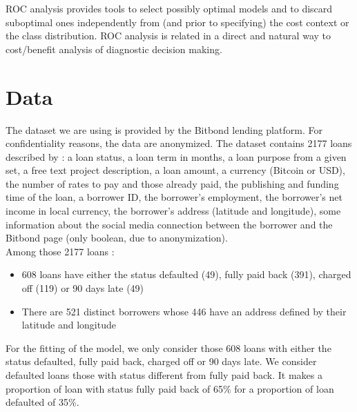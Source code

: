 		ROC analysis provides tools to select possibly optimal models and to discard suboptimal ones independently from (and prior to specifying) the cost context or the class distribution. ROC analysis is related in a direct and natural way to cost/benefit analysis of diagnostic decision making.

\section{Data}\label{sec:data}
	The dataset we are using is provided by the Bitbond lending platform. For confidentiality reasons, the data are anonymized. The dataset contains 2177 loans described by : a loan status, a loan term in months, a loan purpose from a given set, a free text project description, a loan amount, a currency (Bitcoin or USD), the number of rates to pay and those already paid, the publishing and funding time of the loan, a borrower ID, the borrower's employment, the borrower's net income in local currency, the borrower's address (latitude and longitude), some information about the social media connection between the borrower and the Bitbond page (only boolean, due to anonymization).\\

	Among those 2177 loans :
	\begin{itemize}[font=\footnotesize]
		\item 608 loans have either the status defaulted (49), fully paid back (391), charged off (119) or 90 days late (49)
		\item There are 521 distinct borrowers whose 446 have an address defined by their latitude and longitude
	\end{itemize}

	For the fitting of the model, we only consider those 608 loans with either the status defaulted, fully paid back, charged off or 90 days late. We consider defaulted loans those with status different from fully paid back. It makes a proportion of loan with status fully paid back of 65\% for a proportion of loan defaulted of 35\%.